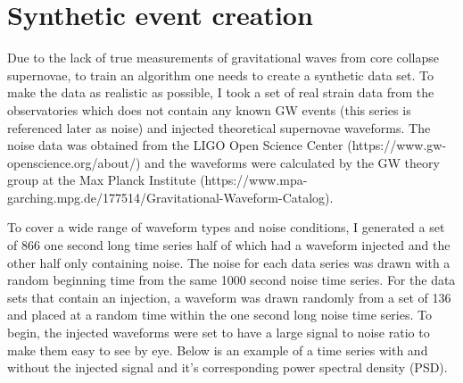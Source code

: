 \documentclass{article}
\begin{document}
\section{Synthetic event creation}
Due to the lack of true measurements of gravitational waves from core collapse supernovae, to train an algorithm one needs to create a synthetic data set. To make the data as realistic as possible, I took a set of real strain data from the observatories which does not contain any known GW events (this series is referenced later as noise) and injected theoretical supernovae waveforms. The noise data was obtained from the LIGO Open Science Center (https://www.gw-openscience.org/about/) and the waveforms were calculated by the GW theory group at the Max Planck Institute (https://www.mpa-garching.mpg.de/177514/Gravitational-Waveform-Catalog).

To cover a wide range of waveform types and noise conditions, I generated a set of 866 one second long time series half of which had a waveform injected and the other half only containing noise. The noise for each data series was drawn with a random beginning time from the same 1000 second noise time series. For the data sets that contain an injection, a waveform was drawn randomly from a set of 136 and placed at a random time within the one second long noise time series. To begin, the injected waveforms were set to have a large signal to noise ratio to make them easy to see by eye. Below is an example of a time series with and without the injected signal and it's corresponding power spectral density (PSD).
\end{document}

